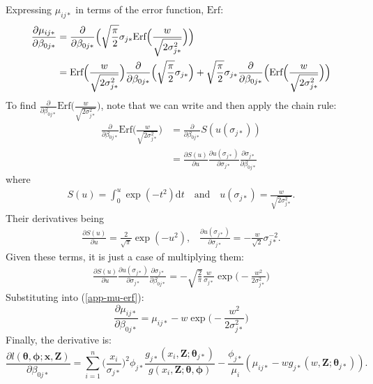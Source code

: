 \documentclass{report}
\begin{document}
Expressing $\mu_{ij*}$ in terms of the error function, $\text{Erf}$:
\begin{align}
\frac{\partial \mu_{ij*}}{\partial \beta_{0j*}} &= \frac{\partial}{\partial \beta_{0j*}} \Big( \sqrt{\frac{\pi}{2}} \sigma_{j*} \text{Erf}\Big(\frac{w}{\sqrt{2\sigma_{j*}^2}}\Big) \Big) \notag \\
&= \text{Erf}\Big(\frac{w}{\sqrt{2\sigma_{j*}^2}}\Big) \frac{\partial}{\partial \beta_{0j*}} \Big( \sqrt{\frac{\pi}{2}} \sigma_{j*} \Big) + \sqrt{\frac{\pi}{2}} \sigma_{j*} \frac{\partial}{\partial \beta_{0j*}} \Big(\text{Erf}\Big(\frac{w}{\sqrt{2\sigma_{j*}^2}}\Big) \Big)\label{app-mu-erf}
\end{align}
To find $\frac{\partial}{\partial \beta_{0j*}} \text{Erf}\Big(\frac{w}{\sqrt{2\sigma_{j*}^2}}\Big)$, note that we can write and then apply the chain rule:
\begin{align*}
\frac{\partial}{\partial \beta_{0j*}} \text{Erf}\Big(\frac{w}{\sqrt{2\sigma_{j*}^2}}\Big) &= \frac{\partial}{\partial \beta_{0j*}} S(u(\sigma_{j*}))\\
&= \frac{\partial S(u)}{\partial u} \frac{\partial u(\sigma_{j*})}{\partial \sigma_{j*} } \frac{\partial \sigma_{j*}}{\partial \beta_{0j*}}
\end{align*}
where 
\begin{align*}
S(u) = \int_0^{u} \exp(-t^2) \text{d}t \quad \text{and} \quad u(\sigma_{j*})=\frac{w}{\sqrt{2\sigma_{j*}^2}}.
\end{align*}
Their derivatives being
\begin{align*}
\frac{\partial S(u)}{\partial u} = \frac{2}{\sqrt{\pi}} \exp(-u^2) \text{,} \quad \frac{\partial u(\sigma_{j*})}{\partial \sigma_{j*}} = -\frac{w}{\sqrt{2}}\sigma_{j*}^{-2}.
\end{align*}
Given these terms, it is just a case of multiplying them:
\begin{align*}
\frac{\partial S(u)}{\partial u} \frac{\partial u(\sigma_{j*})}{\partial \sigma_{j*} } \frac{\partial \sigma_{j*}}{\partial \beta_{0j*}} = - \sqrt{\frac{2}{\pi}} \frac{w}{\sigma_{j*}} \exp\Big( -\frac{w^2}{2\sigma_{j*}^2} \Big)
\end{align*}
Substituting into (\ref{app-mu-erf}):
\begin{equation*}
\frac{\partial \mu_{ij*}}{\partial \beta_{0j*}} =  \mu_{ij*} - w \exp\Big( -\frac{w^2}{2\sigma_{j*}^2} \Big)
\end{equation*}
Finally, the derivative is:
\begin{equation*}
\frac{\partial l(\bm{\theta}, \bm{\phi}; \mathbf{x},\mathbf{Z})}{\partial \beta_{0j*}} = \sum_{i=1}^n \Big( \frac{x_i}{\sigma_{j*}}\Big)^2 \phi_{j*} \frac{g_{j*}(x_i,\mathbf{Z}; \bm{\theta}_{j*})}{g(x_i,\mathbf{Z}; \bm{\theta},\bm{\phi})}  - \frac{\phi_{j*}}{\mu_i} (\mu_{ij*} - w g_{j*}(w,\mathbf{Z}; \bm{\theta}_{j*})).
\end{equation*}
\end{document}
